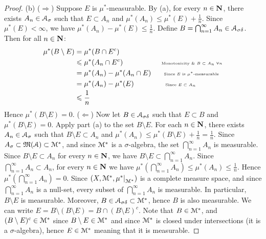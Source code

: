\documentclass[10pt,twoside,openany]{memoir}
\begin{document}
\begin{proof}
        (b) ($\Rightarrow$) Suppose $E$ is $\mu^\ast$-measurable. By (a), for every $n \in \mathbf{N}$, there exists $A_n \in \mathcal{A}_\sigma$ such that $E \subset A_n$ and $\mu^\ast (A_n) \leq \mu^\ast (E) + \frac{1}{n}$. Since $\mu^\ast(E) < \infty$, we have $\mu^\ast(A_n) - \mu^\ast(E) \leq \frac{1}{n}$. Define $B = \bigcap_{n = 1}^\infty A_n \in \mathcal{A}_{\sigma\delta}$. Then for all $n \in \mathbf{N}$:
            \begin{equation*}
            \begin{split}
                \mu^\ast(B \setminus E)
                & = \mu^\ast(B \cap E^c) \\
                & \leq \mu^\ast (A_n \cap E^c) \h9\h9\h9\h9
                \h9\h9\text{\tiny Monotonicity \& $B \subset A_n$ $\forall n$}\\
                & = \mu^\ast(A_n) - \mu^\ast(A_n \cap E) \h9\h9\text{\tiny Since $E$ is $\mu^\ast$-measurable} \\
                & = \mu^\ast(A_n) - \mu^\ast(E) \h9\h9\h9\h9\h8 \text{\tiny Since $E \subset A_n$}\\
                & \leq \frac{1}{n} 
            \end{split}
            \end{equation*}
        Hence $\mu^\ast(B \setminus E) = 0$. ($\Leftarrow$) Now let $B \in \mathcal{A}_{\sigma\delta}$ such that $E \subset B$ and $\mu^\ast(B \setminus E) = 0$. Apply part (a) to the set $B \setminus E$. For each $n \in \mathbf{N}$, there exists $A_n \in \mathcal{A}_\sigma$ such that $B\setminus E \subset A_n$ and $\mu^\ast(A_n) \leq \mu^\ast (B \setminus E) + \frac{1}{n} = \frac{1}{n}$. Since $A_\sigma \subset \mathfrak{M}(\mathcal{A}) \subset \mathcal{M}^\ast$, and since $\mathcal{M}^\ast$ is a $\sigma$-algebra, the set $\bigcap_{n = 1}^\infty A_n$ is measurable. Since $B \setminus E \subset A_n$ for every $n \in \mathbf{N}$, we have $B \setminus E \subset \bigcap_{n = 1}^\infty A_n$. Since $\bigcap_{n = 1}^\infty A_n \subset A_n$, for every $n \in \mathbf{N}$ we have $\mu^\ast \left( \bigcap_{n = 1}^\infty A_n \right) \leq \mu^\ast(A_n) \leq \frac{1}{n}$. Hence $\mu^\ast \left( \bigcap_{n = 1}^\infty A_n \right) = 0$. Since $(X, \cM^\ast , \restr{\mu^\ast}{\cM^\ast})$ is a complete measure space, and since $\bigcap_{n= 1}^\infty A_n$ is a null-set, every subset of $\bigcap_{n= 1}^\infty A_n$ is measurable. In particular, $B \setminus E$ is measurable. Moreover, $B \in \mathcal{A}_{\sigma\delta} \subset \mathcal{M}^\ast$, hence $B$ is also measurable. We can write $E = B \setminus (B \setminus E) = B \cap (B \setminus E)^c$. Note that $B \in \mathcal{M}^\ast$, and $(B \setminus E)^c \in \mathcal{M}^\ast$ since $B \setminus E \in \mathcal{M}^\ast$ and since $\mathcal{M}^\ast$ is closed under intersections (it is a $\sigma$-algebra), hence $E \in \mathcal{M}^\ast$ meaning that it is measurable.


\end{proof}
\end{document}
